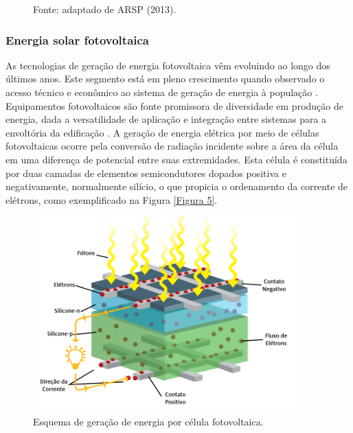\begin{onehalfspace}
\begin{figure}[ht]
        \begin{flushleft}
            \par \small Fonte: adaptado de ARSP (2013).
        \end{flushleft}
        \label{Figura 4}
    \end{figure}\vspace*{-0.63cm}
\subsubsection{Energia solar fotovoltaica}
As tecnologias de geração de energia fotovoltaica vêm evoluindo ao longo dos últimos anos. Este segmento está em pleno crescimento quando observado o acesso técnico e econômico ao sistema de geração de energia à população \cite{Pereira2017}. Equipamentos fotovoltaicos são fonte promissora de diversidade em produção de energia, dada a versatilidade de aplicação e integração entre sistemas para a envoltória da edificação \cite{Sorgato2018}.\vspace{0.3cm} \newline
A geração de energia elétrica por meio de células fotovoltaicas ocorre pela conversão de radiação incidente sobre a área da célula em uma diferença de potencial entre suas extremidades. Esta célula é constituída por duas camadas de elementos semicondutores dopados positiva e negativamente, normalmente silício, o que propicia o ordenamento da corrente de elétrons, como exemplificado na Figura \ref{Figura 5}.\newline \vspace{-0.5cm}
    \begin{figure}[H]
        \centering
        \caption{\small Esquema de geração de energia por célula fotovoltaica.}
        \includegraphics[width=0.9\textwidth]{figures/fig6_geracao_de_conrrente_continua_em_celulcas_fotovoltaicas_ARSP_2018.png}

\end{figure}
\end{onehalfspace}
